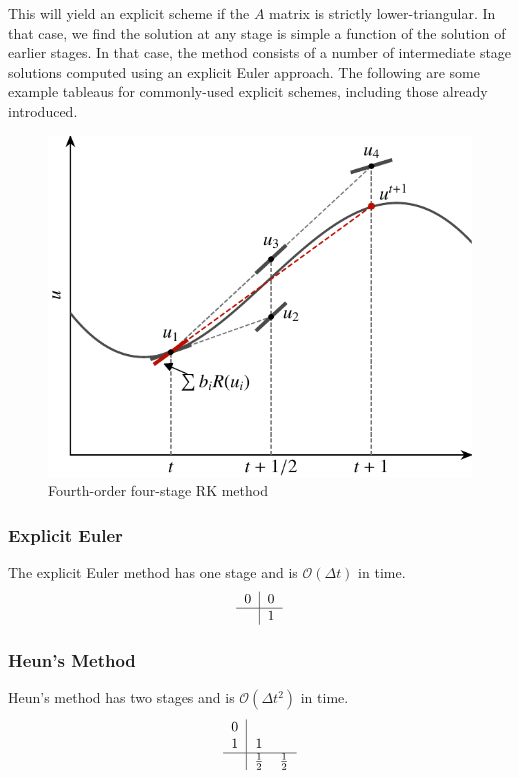 This will yield an explicit scheme if the $A$ matrix is strictly lower-triangular. In that case, we find the solution at any stage is simple a function of the solution of earlier stages. In that case, the method consists of a number of intermediate stage solutions computed using an explicit Euler approach. The following are some example tableaus for commonly-used explicit schemes, including those already introduced.
\begin{figure}[htbp]
	\centering
	\includegraphics[width=0.6\linewidth]{Pictures/ch15_rk_method}
	\caption{Fourth-order four-stage RK method}
	\label{fig:midpoint_method}
\end{figure}

\subsubsection{Explicit Euler}
The explicit Euler method has one stage and is $\mathcal{O}(\Delta t)$ in time.
\begin{equation}
	\begin{tabular}{c|ccccc}
	0   & 0 \\
	\hline
	         & 1\\
	\end{tabular}
\end{equation}

\subsubsection{Heun's Method}
Heun's method has two stages and is $\mathcal{O}(\Delta t^2)$ in time.
\begin{equation}
	\begin{tabular}{c|ccccc}
	0 & \\
	1 & 1 \\
	\hline
	 & $\frac{1}{2}$ & $\frac{1}{2}$\\
	\end{tabular}
\end{equation}

